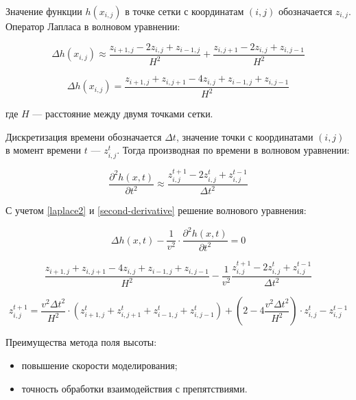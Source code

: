 Значение функции $h(x_{i,j})$ в точке сетки с координатам $(i,j)$ обозначается $z_{i,j}$. Оператор Лапласа в волновом уравнении:

\begin{equation}
    \label{laplace1}
    \Delta h(x_{i,j}) \approx \frac{z_{i+1,j} - 2z_{i,j} + z_{i-1,j}}{H^2} + \frac{z_{i,j+1} - 2z_{i,j} + z_{i,j-1}}{H^2}
\end{equation}

\begin{equation}
    \label{laplace2}
    \Delta h(x_{i,j}) = \frac{z_{i+1,j} + z_{i,j+1} - 4z_{i,j} + z_{i-1,j} + z_{i,j-1}}{H^2}
\end{equation}

где $H$ --- расстояние между двумя точками сетки.

Дискретизация времени обозначается $\Delta t$, значение точки с координатами $(i,j)$ в момент времени $t$ --- $z^t_{i,j}$. Тогда производная по времени в волновом уравнении:

\begin{equation}
    \label{second-derivative}
    \frac{\partial ^2h(x,t)}{\partial t^2} \approx \frac{z^{t+1}_{i,j} - 2z^t_{i,j} + z^{t-1}_{i,j}}{\Delta t^2}
\end{equation}

С учетом \ref{laplace2} и \ref{second-derivative} решение волнового уравнения:

\begin{equation}
    \label{1}
    \Delta h(x,t) - \frac{1}{v^2} \cdot \frac{\partial ^2h(x,t)}{\partial t^2} = 0
\end{equation}

\begin{equation}
    \label{2}
    \frac{z_{i+1,j} + z_{i,j+1} - 4z_{i,j} + z_{i-1,j} + z_{i,j-1}}{H^2} - \frac{1}{v^2} \frac{z^{t+1}_{i,j} - 2z^t_{i,j} + z^{t-1}_{i,j}}{\Delta t^2}
\end{equation}

\begin{equation}
    \label{3}
    z^{t+1}_{i,j} = \frac{v^2 \Delta t^2}{H^2} \cdot (z^t_{i+1,j} + z^t_{i,j+1} + z^t_{i-1,j} + z^t_{i,j-1}) + (2-4\frac{v^2 \Delta t^2}{H^2}) \cdot z^t_{i,j} - z^ {t-1}_{i,j}
\end{equation}

Преимущества метода поля высоты:

\begin{itemize}
	\item повышение скорости моделирования;
	\item точность обработки взаимодействия с препятствиями.
\end{itemize}

